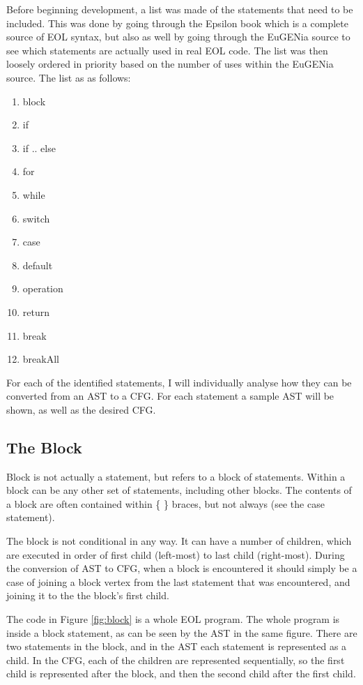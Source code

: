 Before beginning development, a list was made of the statements that need to be included. This was done by going through the Epsilon book \citep{epsilonBook} which is a complete source of EOL syntax, but also as well by going through the EuGENia source to see which statements are actually used in real EOL code. The list was then loosely ordered in priority based on the number of uses within the EuGENia source. The list as as follows:

\begin{enumerate}[nolistsep]
\item block
\item if
\item if .. else
\item for
\item while
\item switch
\item case
\item default
\item operation
\item return
\item break
\item breakAll
\end{enumerate}

For each of the identified statements, I will individually analyse how they can be converted from an AST to a CFG. For each statement a sample AST will be shown, as well as the desired CFG.

\subsection{The Block}
Block is not actually a statement, but refers to a block of statements. Within a block can be any other set of statements, including other blocks. The contents of a block are often contained within \{ \} braces, but not always (see the case statement).

The block is not conditional in any way. It can have a number of children, which are executed in order of first child (left-most) to last child (right-most). During the conversion of AST to CFG, when a block is encountered it should simply be a case of joining a block vertex from the last statement that was encountered, and joining it to the the block's first child.

The code in Figure \ref{fig:block} is a whole EOL program. The whole program is inside a block statement, as can be seen by the AST in the same figure. There are two statements in the block, and in the AST each statement is represented as a child. In the CFG, each of the children are represented sequentially, so the first child is represented after the block, and then the second child after the first child.

